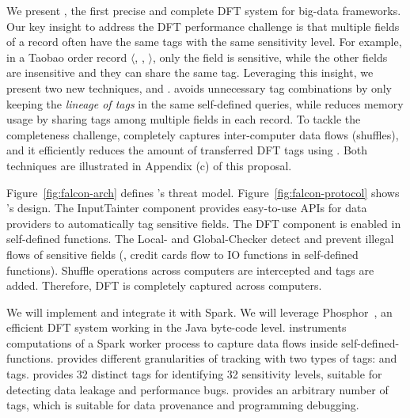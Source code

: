 We present \kakute, the first precise and complete DFT system for big-data 
frameworks. Our key insight to address the DFT performance challenge is that 
multiple fields of a record often have the same tags with the same sensitivity 
level. For example, in a Taobao order record $\langle$, 
, $\rangle$, only the  field is 
sensitive, while the other fields are insensitive and they can share the same 
tag. Leveraging this insight, we present two new techniques, \lazyp and 
\tagcache. \lazyp avoids unnecessary tag combinations by only keeping the 
\textit{lineage of tags} in the same self-defined queries, while \tagcache 
reduces memory usage by sharing tags among multiple fields in each record. To 
tackle the completeness challenge, \kakute completely captures inter-computer 
data flows (shuffles), and it efficiently reduces the amount of 
transferred DFT tags using \tagcache. Both techniques are illustrated in 
Appendix (c) of this proposal.

Figure~\ref{fig:falcon-arch} defines \kakute's threat 
model. Figure~\ref{fig:falcon-protocol} shows \kakute's design. The 
InputTainter component provides easy-to-use APIs for data providers to 
automatically tag sensitive fields. The DFT component is enabled in 
self-defined functions. The Local- and Global-Checker detect and 
prevent illegal flows of sensitive fields (\eg, credit cards flow to IO 
functions in self-defined functions). Shuffle operations across computers are 
intercepted and tags are added. Therefore, DFT is completely captured across 
computers.

We will implement \kakute and integrate it with Spark. We will leverage 
Phosphor~\cite{oo14:phosphor}, an efficient DFT system working in the Java 
byte-code level. \kakute instruments computations of a Spark worker process
to capture data flows inside self-defined-functions. \kakute provides different 
granularities of tracking with two types of tags: 
and  tags.  provides 32 distinct tags for 
identifying 32 sensitivity levels, suitable for detecting data leakage and 
performance bugs.  provides an arbitrary number of tags, which is 
suitable for data provenance and programming debugging.


